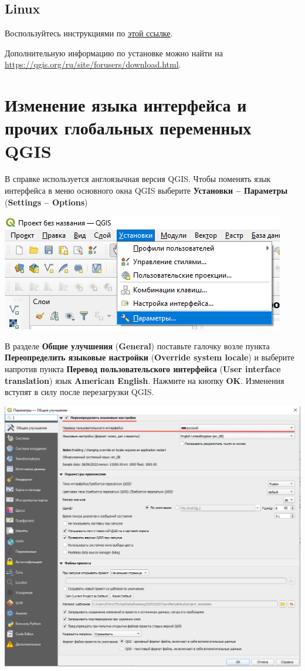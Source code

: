 \documentclass[
  12pt,
]{book}
\begin{document}
\hypertarget{linux}{%
\subsection*{Linux}\label{linux}}

Воспользуйтесь инструкциями по \href{https://qgis.org/ru/site/forusers/alldownloads.html\#linux}{этой ссылке}.

Дополнительную информацию по установке можно найти на \url{https://qgis.org/ru/site/forusers/download.html}.

\hypertarget{global}{%
\section{Изменение языка интерфейса и прочих глобальных переменных QGIS}\label{global}}

В справке используется англоязычная версия QGIS. Чтобы поменять язык интерфейса в меню основного окна QGIS выберите \textbf{Установки -- Параметры} (\textbf{Settings -- Options})

\includegraphics{images/Index0/Options.png}

В разделе \textbf{Общие улучшения} (\textbf{General}) поставьте галочку возле пункта \textbf{Переопределить языковые настройки} (\textbf{Override system locale}) и выберите напротив пункта \textbf{Перевод пользовательского интерфейса} (\textbf{User interface translation}) язык \textbf{American English}. Нажмите на кнопку \textbf{OK}. Изменения вступят в силу после перезагрузки QGIS.

\includegraphics{images/Index0/Interface.png}
\end{document}
